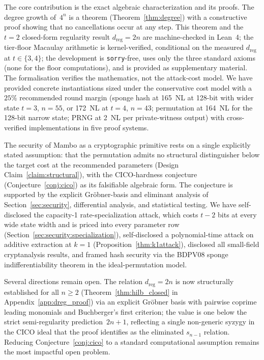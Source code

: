 \documentclass[11pt,a4paper]{article}
\theoremstyle{definition}
\begin{document}
The core contribution is the exact algebraic characterization and its
proofs. The degree growth of~$4^n$ is a theorem
(Theorem~\ref{thm:degree}) with a constructive proof showing that no
cancellations occur at any step. This theorem and the $t=2$
closed-form regularity result $d_{\mathrm{reg}} = 2n$ are
machine-checked in Lean~4; the tier-floor Macaulay arithmetic is
kernel-verified, conditional on the measured $d_{\mathrm{reg}}$ at
$t \in \{3, 4\}$; the development is \texttt{sorry}-free, uses only
the three standard axioms (none for the floor computations), and is
provided as supplementary material. The formalisation verifies the
mathematics, not the attack-cost model. We have provided concrete
instantiations sized under the conservative cost model with a $25\%$
recommended round margin (sponge hash
at 165~NL at 128-bit with wider state $t\!=\!3$, $n\!=\!55$, or
172~NL at $t\!=\!4$, $n\!=\!43$; permutation at 164~NL for the
128-bit narrow state; PRNG at 2~NL per private-witness output) with
cross-verified
implementations in five proof systems.

The security of Mambo as a cryptographic primitive rests on a single
explicitly stated assumption: that the permutation admits no
structural distinguisher below the target cost at the recommended
parameters (Design Claim~\ref{claim:structural}), with the
CICO-hardness conjecture (Conjecture~\ref{conj:cico}) as its
falsifiable algebraic form. The conjecture is supported by the
explicit Gr\"obner-basis and eliminant analysis of
Section~\ref{sec:security}, differential analysis, and statistical
testing. We have self-disclosed the capacity-1 rate-specialization
attack, which costs $t-2$ bits at every wide state width and is
priced into every parameter row
(Section~\ref{sec:security:specialization}), self-disclosed a
polynomial-time attack on additive extraction at $k=1$
(Proposition~\ref{thm:k1attack}), disclosed all small-field
cryptanalysis results, and framed hash security via the BDPV08 sponge
indifferentiability theorem in the ideal-permutation model.

Several directions remain open. The relation
$d_{\mathrm{reg}} = 2n$ is now structurally established for all $n \ge 2$
(Theorem~\ref{thm:hilb_closed} in Appendix~\ref{app:dreg_proof}) via
an explicit Gr\"obner basis with pairwise coprime leading monomials
and Buchberger's first criterion; the value is one below the strict
semi-regularity prediction~$2n+1$, reflecting a single non-generic
syzygy in the CICO ideal that the proof identifies as the eliminated
$s_{n-1}$ relation. Reducing Conjecture~\ref{conj:cico} to a standard
computational assumption remains the most impactful open problem.
\end{document}
